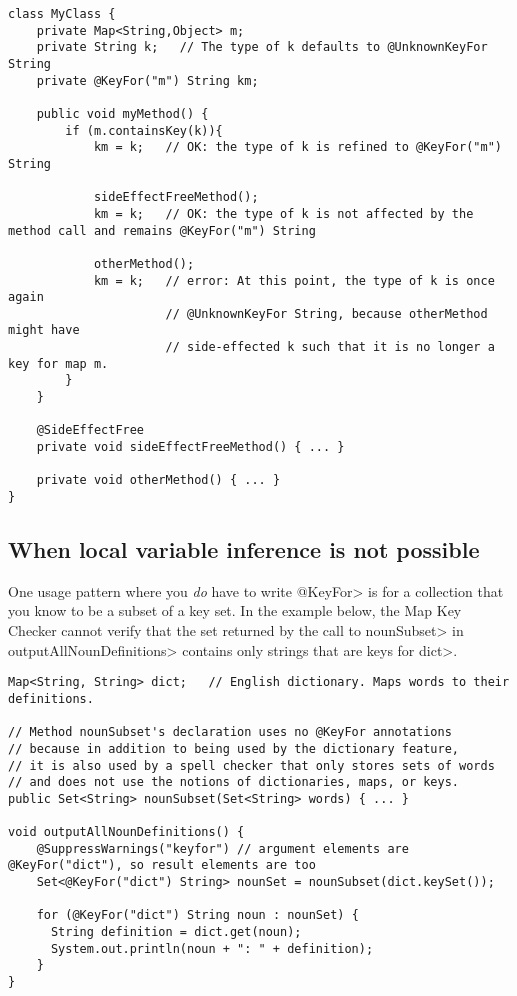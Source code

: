 \begin{verbatim}
class MyClass {
    private Map<String,Object> m;
    private String k;   // The type of k defaults to @UnknownKeyFor String
    private @KeyFor("m") String km;

    public void myMethod() {
        if (m.containsKey(k)){
            km = k;   // OK: the type of k is refined to @KeyFor("m") String

            sideEffectFreeMethod();
            km = k;   // OK: the type of k is not affected by the method call and remains @KeyFor("m") String

            otherMethod();
            km = k;   // error: At this point, the type of k is once again
                      // @UnknownKeyFor String, because otherMethod might have
                      // side-effected k such that it is no longer a key for map m.
        }
    }

    @SideEffectFree
    private void sideEffectFreeMethod() { ... }

    private void otherMethod() { ... }
}
\end{verbatim}


\subsection{When local variable inference is not possible\label{map-key-annotations-inference-exceptions}}

One usage pattern where you \emph{do} have to write \<@KeyFor> is for a
collection that you know to be a subset of a key set.  In the example
below, the Map Key Checker cannot verify that the set returned by the call to \<nounSubset> in
\<outputAllNounDefinitions> contains only strings that are keys for \<dict>.

\begin{verbatim}
Map<String, String> dict;   // English dictionary. Maps words to their definitions.

// Method nounSubset's declaration uses no @KeyFor annotations
// because in addition to being used by the dictionary feature,
// it is also used by a spell checker that only stores sets of words
// and does not use the notions of dictionaries, maps, or keys.
public Set<String> nounSubset(Set<String> words) { ... }

void outputAllNounDefinitions() {
    @SuppressWarnings("keyfor") // argument elements are @KeyFor("dict"), so result elements are too
    Set<@KeyFor("dict") String> nounSet = nounSubset(dict.keySet());

    for (@KeyFor("dict") String noun : nounSet) {
      String definition = dict.get(noun);
      System.out.println(noun + ": " + definition);
    }
}
\end{verbatim}

